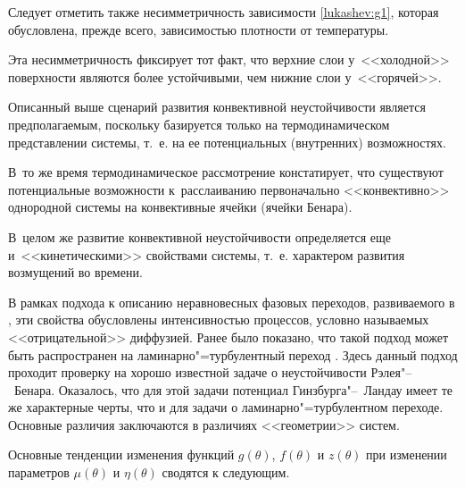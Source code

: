 Следует отметить также несимметричность зависимости  \eqref{lukashev:g1}, которая обусловлена, прежде всего, зависимостью плотности от температуры. 

Эта несимметричность фиксирует тот факт, что верхние слои у~<<холодной>> поверхности являются более устойчивыми, чем нижние слои у~<<горячей>>.



Описанный выше сценарий развития конвективной неустойчивости является предполагаемым, поскольку базируется только на термодинамическом представлении системы, т.~е. на ее потенциальных (внутренних) возможностях. 

В~то же время термодинамическое рассмотрение констатирует, что существуют потенциальные возможности к~расслаиванию первоначально <<конвективно>> однородной системы на конвективные ячейки (ячейки Бенара). 

В~целом же развитие конвективной неустойчивости определяется еще и~<<кинетическими>> свойствами системы, т.~е. характером развития возмущений во времени.



В рамках подхода к описанию неравновесных фазовых переходов, развиваемого в \cite{lukashev:bib30,lukashev:bib50}, эти свойства обусловлены интенсивностью процессов, условно называемых <<отрицательной>> диффузией. Ранее было показано, что такой подход  может быть распространен на ламинарно"=турбулентный переход \cite{lukashev:bib30}. Здесь данный подход проходит проверку на хорошо известной задаче о неустойчивости Рэлея"--~Бенара. Оказалось, что для этой задачи потенциал Гинзбурга"--~Ландау имеет те же характерные черты, что и для задачи о ламинарно"=турбулентном переходе. Основные различия заключаются в различиях <<геометрии>> систем.



Основные тенденции изменения функций $g(\theta)$,  $f(\theta)$  и $z(\theta)$   при изменении параметров $\mu(\theta)$ и $\eta(\theta)$ сводятся к следующим.

